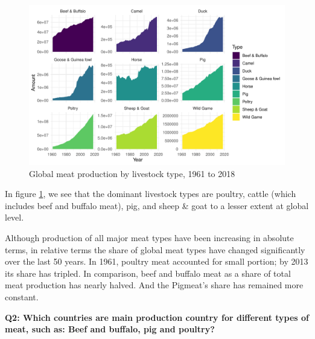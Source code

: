 \documentclass[11pt,a4paper,]{article}
\begin{document}
\begin{figure}
\centering
\includegraphics{report_files/figure-latex/productiontype-1.pdf}
\caption{\label{fig:productiontype}Global meat production by livestock type, 1961 to 2018}
\end{figure}

In figure \ref{fig:productiontype}, we see that the dominant livestock types are poultry, cattle (which includes beef and buffalo meat), pig, and sheep \& goat to a lesser extent at global level.

Although production of all major meat types have been increasing in absolute terms, in relative terms the share of global meat types have changed significantly over the last 50 years. In 1961, poultry meat accounted for small portion; by 2013 its share has tripled. In comparison, beef and buffalo meat as a share of total meat production has nearly halved. And the Pigmeat's share has remained more constant.

\clearpage

\textbf{Q2: Which countries are main production country for different types of meat, such as: Beef and buffalo, pig and poultry? }
\end{document}
